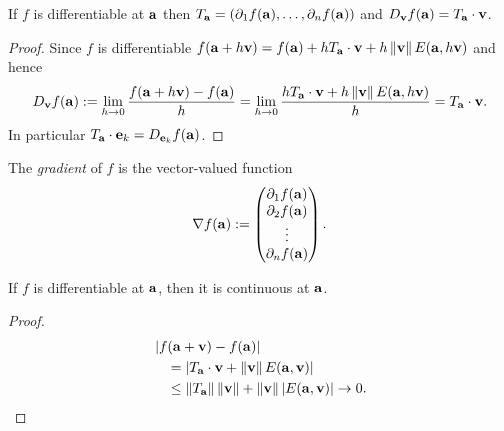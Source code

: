 \begin{theorem}
    If \(f\) is differentiable at \(\aa\)
    then \(T_\aa = \left( \partial_1 f(\aa), \ldots, \partial_nf(\aa) \right)\)
    and \(D_{\vv}f(\aa) = T_{\aa}\cdot \vv\).
\end{theorem}



\begin{proof}
    Since \(f\) is differentiable
    \(  f(\aa+ h \vv) = f(\aa) + h T_\aa \cdot \vv + h\norm{\vv}E(\aa,h\vv)\)
    and hence
    \[
        D_{\vv}f(\aa) :=
        \lim_{h\to 0} \frac{f(\aa+h \vv) - f(\aa)}{h}
        =
        \lim_{h\to 0} \frac{ h T_\aa \cdot \vv + h\norm{\vv}E(\aa,h\vv) }{h}
        = T_\aa \cdot \vv.
    \]
    In particular \(T_\aa\cdot \ee_k = D_{\ee_k}f(\aa)\).
\end{proof}





%
\begin{definition}[Gradient]
    The \emph{gradient} of \(f\) is the vector-valued function
    \[
        \nabla f(\aa) :=
        \begin{pmatrix}
            \partial_1 f(\aa) \\
            \partial_2 f(\aa) \\
            \vdots            \\
            \partial_nf(\aa)
        \end{pmatrix}.
    \]
\end{definition}
%




\begin{theorem}
    If \(f\) is differentiable at \(\aa\), then it is continuous at \(\aa\).
\end{theorem}
\begin{proof}
    \vspace{-2em}
    \begin{align*}
         & \abs{f(\aa+\vv)-f(\aa)}                                                            \\
         & \quad = \abs{ T_\aa \cdot \vv + \norm{\vv}E(\aa,\vv)  }                            \\
         & \quad \leq  \norm{T_\aa } \norm{\vv} + \norm{\vv} \abs{E(\aa,\vv)} \to 0. \qedhere
    \end{align*}
\end{proof}







